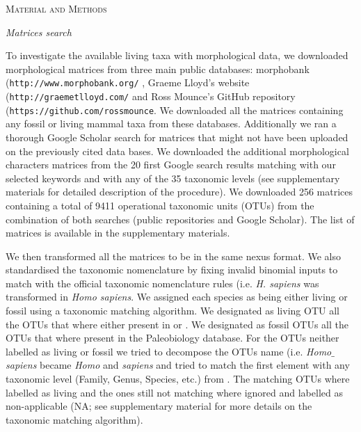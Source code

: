 \documentclass[12pt,letterpaper]{article}
\renewcommand{\section}[1]{%
\bigskip
\begin{center}
\begin{Large}
\normalfont\scshape #1
\medskip
\end{Large}
\end{center}}
\renewcommand{\subsection}[1]{%
\bigskip
\begin{center}
\begin{large}
\normalfont\itshape #1
\end{large}
\end{center}}
\begin{document}
%
%
 

\section{Material and Methods}
\subsection{Matrices search}
To investigate the available living taxa with morphological data, we downloaded morphological matrices from three main public databases: morphobank (\texttt{http://www.morphobank.org/} \citep{morphobank}, Graeme Lloyd's website (\texttt{http://graemetlloyd.com/} and Ross Mounce's GitHub repository (\texttt{https://github.com/rossmounce}.
We downloaded all the matrices containing any fossil or living mammal taxa from these databases.
Additionally we ran a thorough Google Scholar search for matrices that might not have been uploaded on the previously cited data bases.
We downloaded the additional morphological characters matrices from the 20 first Google search results matching with our selected keywords and with any of the 35 taxonomic levels (see supplementary materials for detailed description of the procedure).
We downloaded 256 %
matrices containing a total of 9411 %
operational taxonomic units (OTUs) from the combination of both searches (public repositories and Google Scholar).
The list of matrices is available in the supplementary materials.

We then transformed all the matrices to be in the same nexus format.
We also standardised the taxonomic nomenclature by fixing invalid binomial inputs to match with the official taxonomic nomenclature rules (i.e.
\textit{H.
sapiens} was transformed in \textit{Homo sapiens}.
We assigned each species as being either living or fossil using a taxonomic matching algorithm.
We designated as living OTU all the OTUs that where either present in \citep{FritzTree} or \citep{wilson2005mammal}.
We designated as fossil OTUs all the OTUs that where present in the Paleobiology database.
For the OTUs neither labelled as living or fossil we tried to decompose the OTUs name (i.e.
\textit{Homo$\_$sapiens} became \textit{Homo} and \textit{sapiens} and tried to match the first element with any taxonomic level (Family, Genus, Species, etc.) from \citep{wilson2005mammal}.
The matching OTUs where labelled as living and the ones still not matching where ignored and labelled as non-applicable (NA; see supplementary material for more details on the taxonomic matching algorithm).
\end{document}
